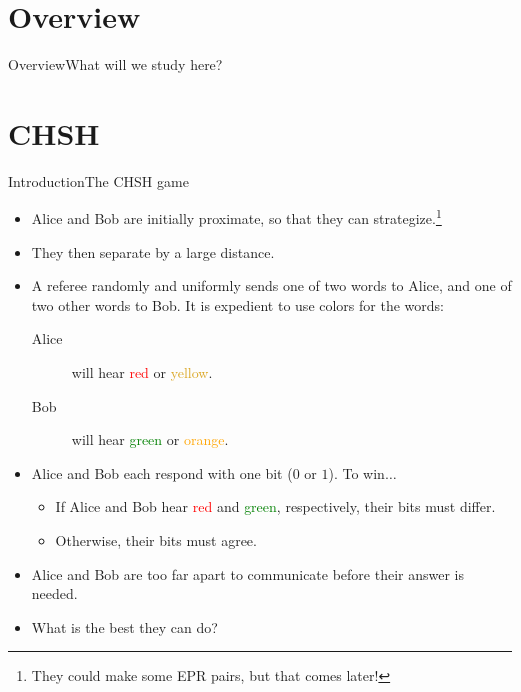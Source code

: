 
\section*{Overview}

\begin{frame}{Overview}{What will we study here?}
\end{frame}

\section*{CHSH}

{%
\def\Red{Red}\def\Yellow{Goldenrod}\def\Green{green}\def\Orange{orange}%
\def\RD#1{\textcolor{\Red}{#1}}
\def\YL#1{\textcolor{\Yellow}{#1}}
\def\GN#1{\textcolor{\Green}{#1}}
\def\OR#1{\textcolor{\Orange}{#1}}
\begin{frame}{Introduction}{The CHSH game}
    \begin{itemize}[<+->]
        \item Alice and Bob are initially proximate, so that they can strategize.\footnote{They could make some EPR pairs, but that comes later!}
        \item They then separate by a large distance.
        \item A referee randomly and uniformly sends one of two words to Alice, and one of two other words to Bob.  It is expedient to use colors for the words:
        \begin{description}
            \item[Alice] will hear \RD{red} or \YL{yellow}.
            \item[Bob] will hear \GN{green} or \OR{orange}.
        \end{description}
    \item Alice and Bob each respond with one bit ($0$ or $1$).  To win$\ldots$
    \begin{itemize}
        \item If Alice and Bob hear \RD{red} and \GN{green}, respectively, their bits must differ.
        \item Otherwise, their bits must agree.
    \end{itemize}
    \item Alice and Bob are too far apart to communicate before their answer is needed.
    \item What is the best they can do?
    \end{itemize}
\end{frame}%

}
